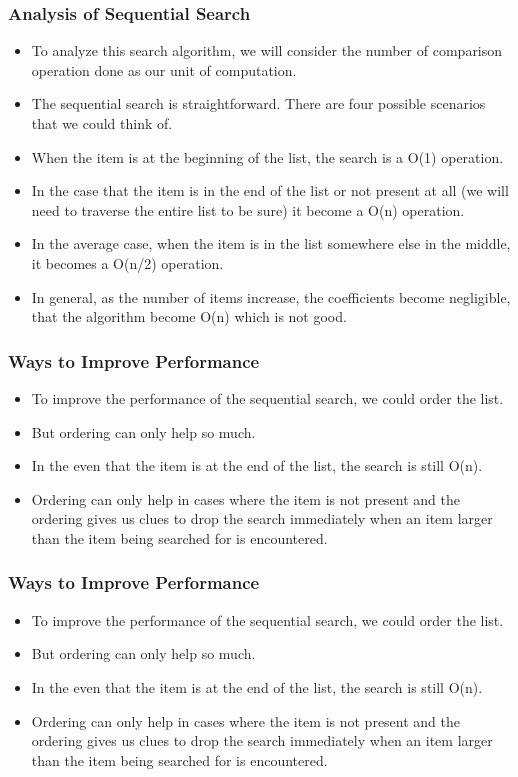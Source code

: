 \documentclass{beamer}
\begin{document}
\begin{frame}[fragile]
\frametitle{Analysis of Sequential Search}
\begin{itemize}
\item To analyze this search algorithm, we will consider the number of comparison operation done as our unit of computation.
\item The sequential search is straightforward. There are four possible scenarios that we could think of.
\item When the item is at the beginning of the list, the search is a O(1) operation.
\item In the case that the item is in the end of the list or not present at all (we will need to traverse the entire list to be sure) it become a O(n) operation.
\item In the average case, when the item is in the list somewhere else in the middle, it becomes a O(n/2) operation.
\item In general, as the number of items increase, the coefficients become negligible, that the algorithm become O(n) which is not good.
\end{itemize}
\end{frame}

\begin{frame}[fragile]
\frametitle{Ways to Improve Performance}
\begin{itemize}
\item To improve the performance of the sequential search, we could order the list.
\item But ordering can only help so much. 
\item In the even that the item is at the end of the list, the search is still O(n). 
\item Ordering can only help in cases where the item is not present and the ordering gives us clues to drop the search immediately when an item larger than the item being searched for is encountered.
\end{itemize}
\end{frame}

\begin{frame}[fragile]
\frametitle{Ways to Improve Performance}
\begin{itemize}
\item To improve the performance of the sequential search, we could order the list.
\item But ordering can only help so much. 
\item In the even that the item is at the end of the list, the search is still O(n). 
\item Ordering can only help in cases where the item is not present and the ordering gives us clues to drop the search immediately when an item larger than the item being searched for is encountered.
\end{itemize}
\end{frame}
\end{document}
